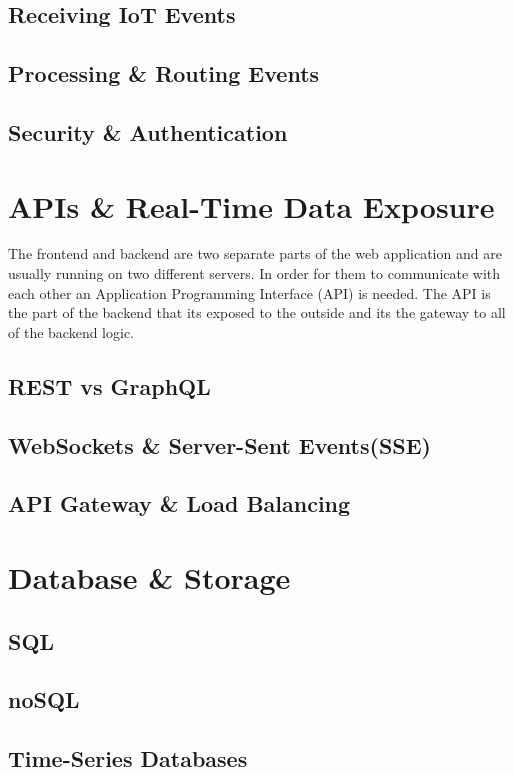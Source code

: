 \subsection{Receiving IoT Events}

\subsection{Processing \& Routing Events}

\subsection{Security \& Authentication}


\section{APIs \& Real-Time Data Exposure}
The frontend and backend are two separate parts of the web application and are
usually running on two different servers. In order for them to communicate with
each other an Application Programming Interface (API) is needed. The API is the
part of the backend that its exposed to the outside and its the gateway to all
of the backend logic.
\subsection{REST vs GraphQL}
\subsection{WebSockets \& Server-Sent Events(SSE)}
\subsection{API Gateway \& Load Balancing}

\section{Database \& Storage}
\subsection{SQL}
\subsection{noSQL}
\subsection{Time-Series Databases}
